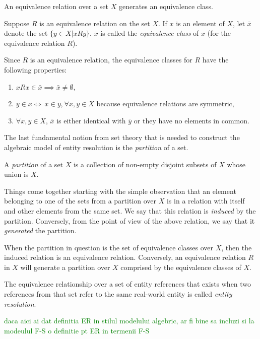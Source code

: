 An equivalence relation over a set $X$ generates an equivalence class.

\begin{defn}Suppose $R$ is an equivalence relation on the set $X$.
If $x$ is an element of $X$, let $\bar{x}$ denote the set
$\{y \in X | xRy\}$.
$\bar{x}$ is called the \textit{equivalence class} of $x$ (for the
equivalence relation $R$)\cite{hoffman1971linear}.
\end{defn}

Since $R$ is an equivalence relation, the equivalence classes for $R$ have the
following properties\cite{hoffman1971linear}:
\begin{enumerate}
    \item $xRx \in \bar{x} \implies \bar{x} \neq \emptyset$,
    \item $y\in\bar{x}\iff~x\in\bar{y}$,$~\forall x,y \in X$ because
    equivalence relations are symmetric,
    \item $\forall x,y \in X$, $\bar{x}$ is either identical with $\bar{y}$
    or they have no elements in common\cite{hoffman1971linear,Tal11}.
\end{enumerate}

The last fundamental notion from set theory that is needed to construct the
algebraic model of entity resolution is the \textit{partition} of a set.

\begin{defn}
    A \textit{partition} of a set $X$ is a collection of non-empty disjoint
    subsets of $X$ whose union is $X$\cite{halmos1960naive,Tal11}.
\end{defn}

Things come together starting with the simple observation that an element
belonging to one of the sets from a partition over $X$ is in a relation with
itself and other elements from the same set.
We say that this relation is \textit{induced} by the partition.
Conversely, from the point of view of the above relation, we say that it
\textit{generated} the partition.

When the partition in question is the set of equivalence classes over $X$,
then the induced relation is an equivalence relation.
Conversely, an equivalence relation $R$ in $X$ will generate a partition
over $X$ comprised by the equivalence classes of $X$\cite{halmos1960naive,
Tal11}.

\begin{defn}
    The equivalence relationship over a set of entity references that exists
    when two references from that set refer to the same real-world entity is
    called \textit{entity resolution}.
\end{defn}
\textcolor{green}{daca aici ai dat definitia ER in stilul modelului algebric, ar fi bine sa incluzi si la modeulul F-S o definitie pt ER in termenii F-S}



